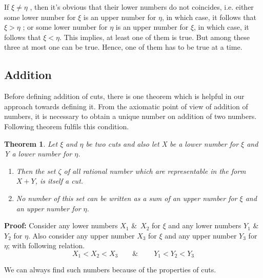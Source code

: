 \documentclass[12pt,a4paper,final,titlepage]{article}
\newtheorem{thm}{Theorem}
\begin{document}
If $\xi \neq \eta$ , then it's obvious that their lower numbers do not coincides, i.e. either some lower number for $\xi$ is an upper number for $\eta$, in which case, it follows that $\xi > \eta$ ; or some lower number for $\eta$ is an upper number for $\xi$, in which case, it follows that $\xi < \eta$. This implies, at least one of them is true. But among these three at most one can be true. Hence, one of them has to be true at a time.

\bigskip

\subsection{Addition}
Before defining addition of cuts, there is one theorem which is helpful in our approach towards defining it. From the axiomatic point of view of addition of numbers, it is necessary to obtain a unique number on addition of two numbers. Following theorem fulfils this condition.
\begin{thm}\label{thm4}
Let $\xi$ and $\eta$ be two cuts and also let X be a lower number for $\xi$ and Y a lower number for $\eta$.
\begin{enumerate}
\item Then the set $\zeta$ of all rational number which are representable in the form $X + Y$, is itself a cut.
\item No number of this set can be written as a sum of an upper number for $\xi$ and an upper number for $\eta$.
\end{enumerate}
\end{thm}
\textbf{Proof:} Consider any lower numbers $X_1$ \&\ $X_2$ for $\xi$ and any lower numbers $Y_1$ \&\ $Y_2$ for $\eta$. Also consider any upper number $X_3$ for $\xi$ and any upper number $Y_3$ for $\eta$; with following relation.
\begin{equation}
X_1<X_2<X_3\qquad \&\ \qquad Y_1<Y_2<Y_3 \nonumber
\end{equation}

We can always find such numbers because of the properties of cuts.
\end{document}
